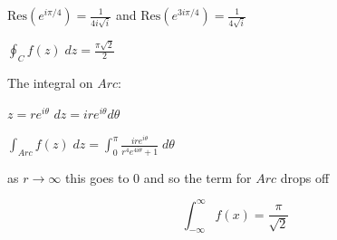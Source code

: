 $\text{Res}(e^{i\pi/4}) = \frac{1}{4 i \sqrt{i}}$ and $\text{Res}(e^{3i\pi/4}) = \frac{1}{4 \sqrt{i}}$ 

$\oint_C f(z) \;dz = \frac{\pi \sqrt{2}}{2}$

The integral on $Arc$:

$z = re^{i \theta}$ $dz=ire^{i\theta} d\theta$

$\int_{Arc} f(z) \;dz = \int_0^\pi \frac{ire^{i\theta}}{r^4 e^{4i\theta} +1} \; d\theta$

as $r \to \infty$ this goes to 0  and so the term for $Arc$ drops off

\begin{equation}
	\int_{-\infty}^\infty f(x) = \frac{\pi }{\sqrt{2}}
\end{equation}

